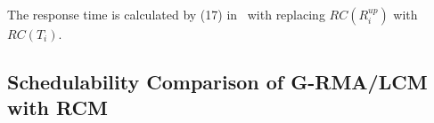 \documentclass[conference]{sig-alternate}
\begin{document}

The response time is calculated by (17) in~\cite{stmconcurrencycontrol:emsoft11} with replacing $RC(R_i^{up})$ with $RC(T_i)$.

\subsection{Schedulability Comparison of G-RMA/LCM with RCM}
\label{rma eval}
\end{document}
